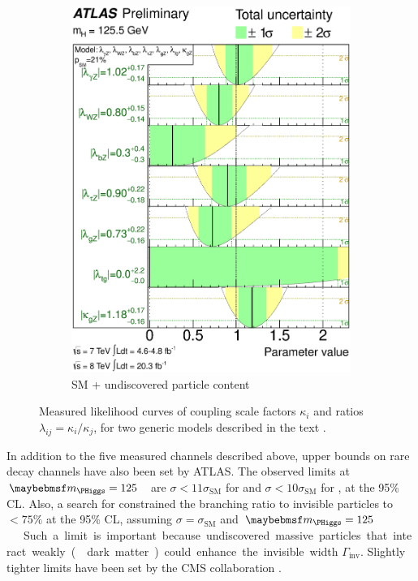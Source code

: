 \begin{figure}[t]
\begin{subfigure}[b]{0.495\textwidth}
		\includegraphics[width=\textwidth]{tex/conclusions/atlas_couplings_BSM}
		\caption{SM + undiscovered particle content}
		\label{fig:concl:couplings:BSM}
	\end{subfigure}
	\caption{Measured likelihood curves of coupling scale factors $\kappa_i$ and ratios 
	$\lambda_{ij} = \kappa_i / \kappa_j$, for two generic models described in the text 
	\cite{ATLAS:couplings:Moriond14}.}
	\label{fig:concl:couplings}
\end{figure}

In addition to the five measured channels described above, upper bounds on rare decay 
channels have also been set by ATLAS. The observed limits at \unit{$\mH = 125$}{\GeV} are 
$\sigma < 11\sigma_{\text{SM}}$ for \HepProcess{\PHiggs \HepTo \PZ\Pphoton} 
\cite{ATLAS:HZgam} and $\sigma < 10\sigma_{\text{SM}}$ for \HepProcess{\PHiggs \HepTo 
\Pmu\Pmu} \cite{ATLAS:Hmumu}, at the 95\% CL. Also, a search for \HepProcess{\ZH \HepTo 
\Plepton\Plepton\met} constrained the branching ratio to invisible particles to 
$< 75\%$ at the 95\% CL, assuming $\sigma = \sigma_{\text{SM}}$ and 
\unit{$\mH = 125$}{\GeV} \cite{ATLAS:Hinv}. Such a limit is important because 
undiscovered massive particles that interact weakly (\eg dark matter) could 
enhance the invisible width $\Gamma_{\text{inv}}$. Slightly tighter limits have been set by 
the CMS collaboration \cite{CMS:HZgam,CMS:Hmumu,CMS:Hinv}.



